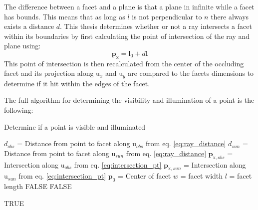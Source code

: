 The difference between a facet and a plane is that a plane in infinite while a facet has bounds. This means that as long as $l$ is not perpendicular to $n$ there always exists a distance $d$. This thesis determines whether or not a ray intersects a facet within its boundaries by first calculating the point of intersection of the ray and plane using:
\begin{equation}\label{eq:intersection_pt}
\bm{p}_{\mathrm{x}} = \bm{l}_0 + d\bm{l}
\end{equation}
This point of intersection is then recalculated from the center of the occluding facet and its projection along $\bm{\mathrm{u}}_x$ and $\bm{\mathrm{u}}_y$ are compared to the facets dimensions to determine if it hit within the edges of the facet.

The full algorithm for determining the visibility and illumination of a point is the following:
\begin{algorithm}
	\caption{Determine if a point is visible and illuminated}
	\begin{algorithmic}
		
			\STATE $d_{obs}$ = Distance from point to facet along $\bm{\mathrm{u}}_{obs}$ from eq. \ref{eq:ray_distance}
			\STATE $d_{sun}$ = Distance from point to facet along $\bm{\mathrm{u}}_{sun}$ from eq. \ref{eq:ray_distance}
			\STATE $\bm{p}_{\mathrm{x}, obs}$ = Intersection along $\bm{\mathrm{u}}_{obs}$ from eq. \ref{eq:intersection_pt} 
			\STATE $\bm{p}_{\mathrm{x}, sun}$ = Intersection along $\bm{\mathrm{u}}_{sun}$ from eq. \ref{eq:intersection_pt}
			\STATE $\bm{p}_0$ = Center of facet
			\STATE $w$ = facet width
			\STATE $l$ = facet length
				\RETURN FALSE 
			\ENDIF
			\ENDIF
				\RETURN FALSE 
			\ENDIF
			\ENDIF
			
		\ENDFOR
		\RETURN TRUE 

	\end{algorithmic}
\end{algorithm}

